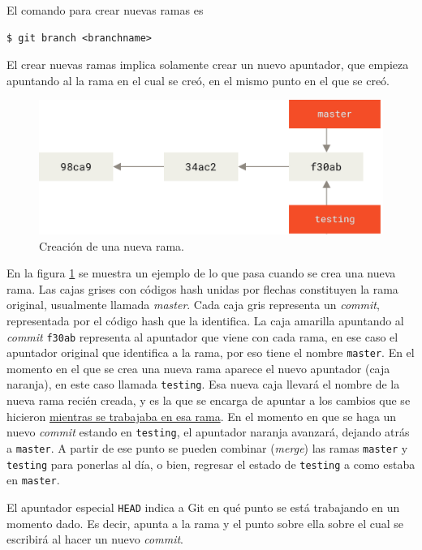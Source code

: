 \documentclass[spanish, 12pt, a4paper]{article}
\begin{document}
El comando para crear nuevas ramas es
\begin{lstlisting}
$ git branch <branchname>
\end{lstlisting}

El crear nuevas ramas implica solamente crear un nuevo apuntador, que empieza apuntando al la rama en el cual se creó, en el mismo punto en el que se creó.

\begin{figure}[h]
  \centering
  \includegraphics[width=\textwidth]{figs/two-branches.png}
  \caption{Creación de una nueva rama.}
  \label{fig:two-branches}
\end{figure}

En la figura \ref{fig:two-branches} se muestra un ejemplo de lo que pasa cuando se crea una nueva rama.
Las cajas grises con códigos hash unidas por flechas constituyen la rama original, usualmente llamada \textit{master}.
Cada caja gris representa un \textit{commit}, representada por el código hash que la identifica.
La caja amarilla apuntando al \textit{commit} \texttt{f30ab} representa al apuntador que viene con cada rama, en ese caso el apuntador original que identifica a la rama, por eso tiene el nombre \texttt{master}.
En el momento en el que se crea una nueva rama aparece el nuevo apuntador (caja naranja), en este caso llamada \texttt{testing}.
Esa nueva caja llevará el nombre de la nueva rama recién creada, y es la que se encarga de apuntar a los cambios que se hicieron \underline{mientras se trabajaba en esa rama}.
En el momento en que se haga un nuevo \textit{commit} estando en \texttt{testing}, el apuntador naranja avanzará, dejando atrás a \texttt{master}.
A partir de ese punto se pueden combinar (\textit{merge}) las ramas \texttt{master} y \texttt{testing} para ponerlas al día, o bien, regresar el estado de \texttt{testing} a como estaba en \texttt{master}.

El apuntador especial \texttt{HEAD} indica a Git en qué punto se está trabajando en un momento dado.
Es decir, apunta a la rama y el punto sobre ella sobre el cual se escribirá al hacer un nuevo \textit{commit}.
\end{document}
